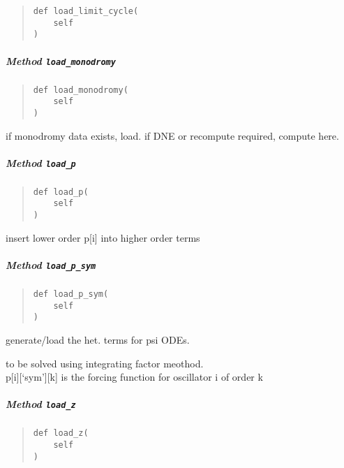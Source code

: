 \documentclass[english,a4paper,oneside]{article}
\let\oldsubparagraph\subparagraph
\renewcommand{\subparagraph}[1]{\oldsubparagraph{#1}\mbox{}}
\begin{document}
\begin{quote}
\begin{verbatim}
def load_limit_cycle(
    self
)
\end{verbatim}
\end{quote}

\hypertarget{nBodyCoupling.nBodyCoupling.load_monodromy}{%
\subparagraph{\texorpdfstring{Method
\texttt{load\_monodromy}}{Method load\_monodromy}}\label{nBodyCoupling.nBodyCoupling.load_monodromy}}

\begin{quote}
\begin{verbatim}
def load_monodromy(
    self
)
\end{verbatim}
\end{quote}

if monodromy data exists, load. if DNE or recompute required, compute
here.

\hypertarget{nBodyCoupling.nBodyCoupling.load_p}{%
\subparagraph{\texorpdfstring{Method
\texttt{load\_p}}{Method load\_p}}\label{nBodyCoupling.nBodyCoupling.load_p}}

\begin{quote}
\begin{verbatim}
def load_p(
    self
)
\end{verbatim}
\end{quote}

insert lower order p{[}i{]} into higher order terms

\hypertarget{nBodyCoupling.nBodyCoupling.load_p_sym}{%
\subparagraph{\texorpdfstring{Method
\texttt{load\_p\_sym}}{Method load\_p\_sym}}\label{nBodyCoupling.nBodyCoupling.load_p_sym}}

\begin{quote}
\begin{verbatim}
def load_p_sym(
    self
)
\end{verbatim}
\end{quote}

generate/load the het. terms for psi ODEs.

to be solved using integrating factor meothod.\\
p{[}i{]}{[}`sym'{]}{[}k{]} is the forcing function for oscillator i of
order k

\hypertarget{nBodyCoupling.nBodyCoupling.load_z}{%
\subparagraph{\texorpdfstring{Method
\texttt{load\_z}}{Method load\_z}}\label{nBodyCoupling.nBodyCoupling.load_z}}

\begin{quote}
\begin{verbatim}
def load_z(
    self
)
\end{verbatim}
\end{quote}
\end{document}
